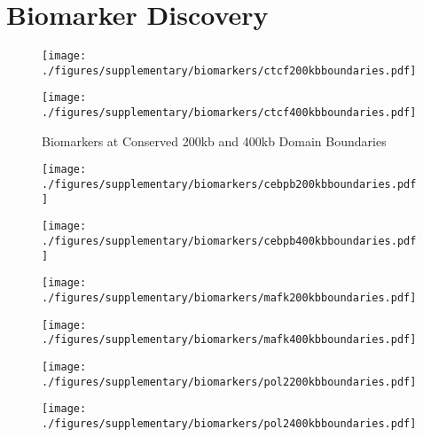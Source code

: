 \newpage
\section*{Biomarker Discovery}

\begin{figure}[H]
  \caption{Biomarkers at Conserved 200kb and 400kb Domain Boundaries}\label{fig:boundaryBiomarkers}
  \begin{minipage}{0.5\textwidth}%
    \texttt{[image: ./figures/supplementary/biomarkers/ctcf200kbboundaries.pdf]}
  \end{minipage}%
  \hfill
  \begin{minipage}{0.5\textwidth}
    \texttt{[image: ./figures/supplementary/biomarkers/ctcf400kbboundaries.pdf]}
  \end{minipage}
\end{figure}

\begin{figure}[H]
  \begin{minipage}{0.5\textwidth}%
    \texttt{[image: ./figures/supplementary/biomarkers/cebpb200kbboundaries.pdf]}
  \end{minipage}%
  \hfill
  \begin{minipage}{0.5\textwidth}
    \texttt{[image: ./figures/supplementary/biomarkers/cebpb400kbboundaries.pdf]}
  \end{minipage}
\end{figure}

\begin{figure}[H]
  \begin{minipage}{0.5\textwidth}%
    \texttt{[image: ./figures/supplementary/biomarkers/mafk200kbboundaries.pdf]}
  \end{minipage}%
  \hfill
  \begin{minipage}{0.5\textwidth}
    \texttt{[image: ./figures/supplementary/biomarkers/mafk400kbboundaries.pdf]}
  \end{minipage}
\end{figure}

\begin{figure}[H]
  \begin{minipage}{0.5\textwidth}%
    \texttt{[image: ./figures/supplementary/biomarkers/pol2200kbboundaries.pdf]}
  \end{minipage}%
  \hfill
  \begin{minipage}{0.5\textwidth}
    \texttt{[image: ./figures/supplementary/biomarkers/pol2400kbboundaries.pdf]}
  \end{minipage}
\end{figure}

